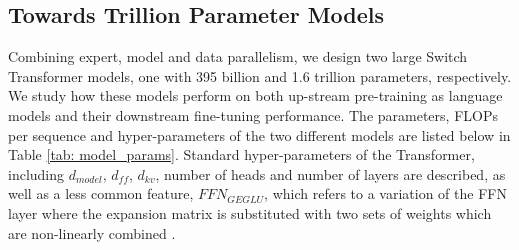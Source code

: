 \documentclass[twoside,11pt]{article}
\begin{document}
\subsection{Towards Trillion Parameter Models}
\label{sec:trillion_results}
Combining expert, model and data parallelism, we design two large Switch Transformer models, one with 395 billion and 1.6 trillion parameters, respectively. 
We study how these models perform on both up-stream pre-training as language models and their downstream fine-tuning performance.
The parameters, FLOPs per sequence and hyper-parameters of the two different models are listed below in Table \ref{tab: model_params}.
Standard hyper-parameters of the Transformer, including $d_{model}$, $d_{ff}$, $d_{kv}$, number of heads and number of layers are described, as well as a less common feature, $FFN_{GEGLU}$, which refers to a variation of the FFN layer where the expansion matrix is substituted with two sets of weights which are non-linearly combined \citep{shazeer2020glu}.
\end{document}
